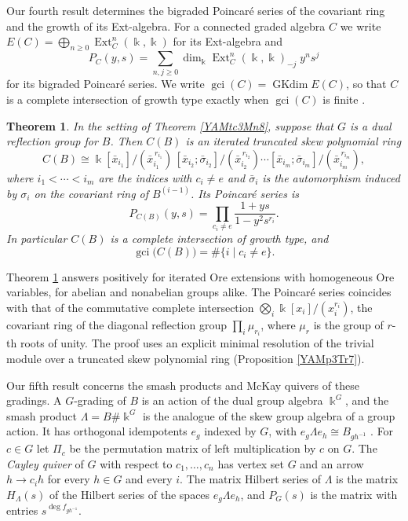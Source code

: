 \documentclass[reqno]{amsart}
\numberwithin{equation}{section}
\theoremstyle{definition}
\theoremstyle{remark}
\theoremstyle{plain}
\newtheorem{introtheorem}{Theorem}
\newcommand{\kk}{\Bbbk}
\DeclareMathOperator{\Ext}{Ext}
\DeclareMathOperator{\GKdim}{GKdim}
\DeclareMathOperator{\gci}{gci}
\begin{document}
Our fourth result determines the bigraded Poincar\'e series of the covariant ring and the growth of its Ext-algebra. For a connected graded algebra $C$ we write $E(C)=\bigoplus_{n\ge0}\Ext^n_C(\kk,\kk)$ for its Ext-algebra and
\[
P_C(y,s)=\sum_{n,j\ge0}\dim_\kk\Ext^n_C(\kk,\kk)_{-j}\;y^ns^j
\]
for its bigraded Poincar\'e series. We write $\gci(C)=\GKdim E(C)$, so that $C$ is a complete intersection of growth type exactly when $\gci(C)$ is finite \cite[Definition 1.5]{KKZ2}.

\begin{introtheorem}\label{YAMtd9Ci4}
In the setting of Theorem \ref{YAMtc3Mn8}, suppose that $G$ is a dual reflection group for $B$. Then $C(B)$ is an iterated truncated skew polynomial ring
\[
C(B)\cong\kk[\bar x_{i_1}]/(\bar x_{i_1}^{\,r_{i_1}})\,[\bar x_{i_2};\bar\sigma_{i_2}]/(\bar x_{i_2}^{\,r_{i_2}})\cdots[\bar x_{i_m};\bar\sigma_{i_m}]/(\bar x_{i_m}^{\,r_{i_m}}),
\]
where $i_1<\cdots<i_m$ are the indices with $c_i\neq e$ and $\bar\sigma_i$ is the automorphism induced by $\sigma_i$ on the covariant ring of $B^{(i-1)}$. Its Poincar\'e series is
\[
P_{C(B)}(y,s)=\prod_{c_i\neq e}\frac{1+ys}{1-y^2s^{r_i}}.
\]
In particular $C(B)$ is a complete intersection of growth type, and
\[
\gci\big(C(B)\big)=\#\{i\mid c_i\neq e\}.
\]
\end{introtheorem}

Theorem \ref{YAMtd9Ci4} answers \cite[Question 0.7]{KKZ} positively for iterated Ore extensions with homogeneous Ore variables, for abelian and nonabelian groups alike. The Poincar\'e series coincides with that of the commutative complete intersection $\bigotimes_i\kk[x_i]/(x_i^{r_i})$, the covariant ring of the diagonal reflection group $\prod_i\mu_{r_i}$, where $\mu_r$ is the group of $r$-th roots of unity. The proof uses an explicit minimal resolution of the trivial module over a truncated skew polynomial ring (Proposition \ref{YAMp3Tr7}).

Our fifth result concerns the smash products and McKay quivers of these gradings. A $G$-grading of $B$ is an action of the dual group algebra $\kk^G$, and the smash product $\Lambda=B\#\kk^G$ is the analogue of the skew group algebra of a group action. It has orthogonal idempotents $e_g$ indexed by $G$, with $e_g\Lambda e_h\cong B_{gh^{-1}}$ \cite[Corollary 1.5]{CoMo}. For $c\in G$ let $\Pi_c$ be the permutation matrix of left multiplication by $c$ on $G$. The \emph{Cayley quiver} of $G$ with respect to $c_1,\dots,c_n$ has vertex set $G$ and an arrow $h\to c_ih$ for every $h\in G$ and every $i$. The matrix Hilbert series of $\Lambda$ is the matrix $H_\Lambda(s)$ of the Hilbert series of the spaces $e_g\Lambda e_h$, and $P_G(s)$ is the matrix with entries $s^{\deg f_{gh^{-1}}}$.
\end{document}
